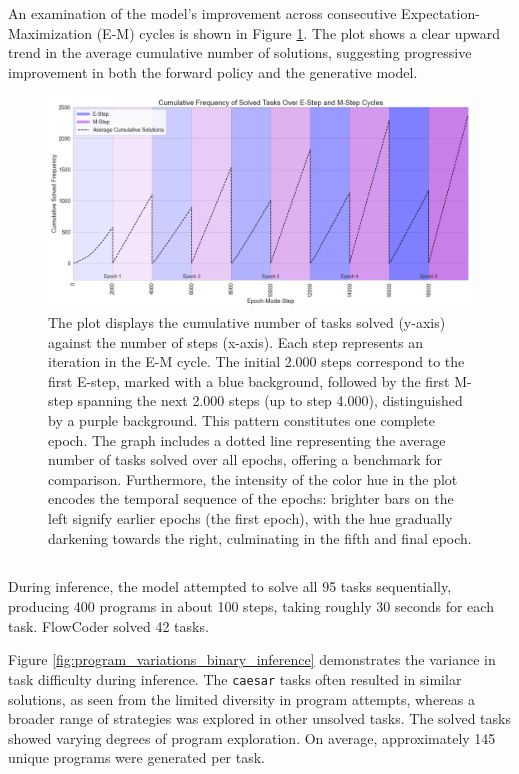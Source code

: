 An examination of the model's improvement across consecutive Expectation-Maximization (E-M) cycles is shown in Figure \ref{fig:em_cycles}. The plot shows a clear upward trend in the average cumulative number of solutions, suggesting progressive improvement in both the forward policy and the generative model.

\begin{figure}[H]
    \centering
    \includegraphics[width=\textwidth]{../img/em_cycles.png}
    \caption{The plot displays the cumulative number of tasks solved (y-axis) against the number of steps (x-axis). Each step represents an iteration in the E-M cycle. The initial 2.000 steps correspond to the first E-step, marked with a blue background, followed by the first M-step spanning the next 2.000 steps (up to step 4.000), distinguished by a purple background. This pattern constitutes one complete epoch. The graph includes a dotted line representing the average number of tasks solved over all epochs, offering a benchmark for comparison. Furthermore, the intensity of the color hue in the plot encodes the temporal sequence of the epochs: brighter bars on the left signify earlier epochs (the first epoch), with the hue gradually darkening towards the right, culminating in the fifth and final epoch.}
    \label{fig:em_cycles}
\end{figure}


\subsection{}
During inference, the model attempted to solve all 95 tasks sequentially, producing 400 programs in about 100 steps, taking roughly 30 seconds for each task. FlowCoder solved 42 tasks.

Figure \ref{fig:program_variations_binary_inference} demonstrates the variance in task difficulty during inference. The \texttt{caesar} tasks often resulted in similar solutions, as seen from the limited diversity in program attempts, whereas a broader range of strategies was explored in other unsolved tasks. The solved tasks showed varying degrees of program exploration. On average, approximately 145 unique programs were generated per task.

